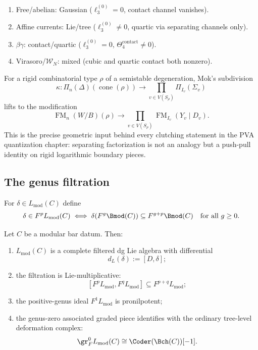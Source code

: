 \begin{remark}
\label{rem:vol2-family-by-family-low-order-atlas}
\begin{enumerate}[label=\textup{(\roman*)}]
\item Free/abelian: Gaussian ($\ell_3^{(0)}=0$, contact channel vanishes).
\item Affine currents: Lie/tree ($\ell_3^{(0)}\neq 0$, quartic via separating channels only).
\item $\beta\gamma$: contact/quartic ($\ell_3^{(0)}=0$, $\Theta_4^{\mathrm{contact}}\neq 0$).
\item Virasoro/$\mathcal W_N$: mixed (cubic and quartic contact both nonzero).
\end{enumerate}
\end{remark}

\begin{remark}
\label{rem:vol2-mok-cutting-map-factorization}
For a rigid combinatorial type $\rho$ of a semistable degeneration, Mok's subdivision
\[
\kappa\colon \Pi_n(\Delta)(\operatorname{cone}(\rho))\to \prod_{v\in V(S_\rho)}\Pi_{I_v}(\Sigma_v)
\]
lifts to the modification
\[
\operatorname{FM}_n(W/B)(\rho)\to \prod_{v\in V(S_\rho)}\operatorname{FM}_{I_v}(Y_v\mathbin{|}D_v).
\]
This is the precise geometric input behind every clutching statement in the PVA quantization chapter:
separating factorization is not an analogy but a push-pull identity on rigid logarithmic boundary pieces.
\end{remark}


\subsection{The genus filtration}

\begin{definition}
For $\delta\in L_{\mathrm{mod}}(C)$ define
\[
\delta\in F^pL_{\mathrm{mod}}(C)
\iff
\delta(F^g\Bmod(C))\subseteq F^{g+p}\Bmod(C)
\quad\text{for all }g\ge 0.
\]
\end{definition}

\begin{theorem}\label{thm:formal-structure}
Let $C$ be a modular bar datum. Then:
\begin{enumerate}[leftmargin=2.4em]
\item $L_{\mathrm{mod}}(C)$ is a complete filtered dg Lie algebra with differential
\[
d_L(\delta):=[D,\delta];
\]
\item the filtration is Lie-multiplicative:
\[
[F^pL_{\mathrm{mod}},F^qL_{\mathrm{mod}}]\subseteq F^{p+q}L_{\mathrm{mod}};
\]
\item the positive-genus ideal $F^1L_{\mathrm{mod}}$ is pronilpotent;
\item the genus-zero associated graded piece identifies with the ordinary tree-level deformation complex:
\[
\gr_F^0 L_{\mathrm{mod}}(C)\cong \Coder(\Bch(C))[-1].
\]
\end{enumerate}
\end{theorem}

